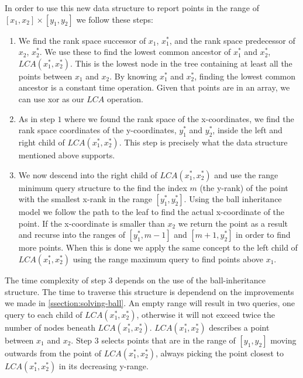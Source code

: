 In order to use this new data structure to report points in the range of $[x_1, x_2] \times [y_1, y_2]$ we follow these steps:
\begin{enumerate}
  \item We find the rank space successor of $x_1$, $x^*_1$, and the rank space predecessor of $x_2$, $x^*_2$. We use these to find the lowest common ancestor of $x^*_1$ and $x^*_2$, $LCA(x^*_1, x^*_2)$. This is the lowest node in the tree containing at least all the points between $x_1$ and $x_2$. By knowing $x^*_1$ and $x^*_2$, finding the lowest common ancestor is a constant time operation. Given that points are in an array, we can use xor as our $LCA$ operation. 
  \item As in step $1$ where we found the rank space of the x-coordinates, we find the rank space coordinates of the y-coordinates, $y^*_1$ and $y^*_2$, inside the left and right child of $LCA(x^*_1, x^*_2)$. This step is precisely what the data structure mentioned above supports.
  \item We now descend into the right child of $LCA(x^*_1, x^*_2)$ and use the range minimum query structure to the find the index $m$ (the y-rank) of the point with the smallest x-rank in the range $[y^*_1, y^*_2]$. Using the ball inheritance model we follow the path to the leaf to find the actual x-coordinate of the point. If the x-coordinate is smaller than $x_2$ we return the point as a result and recurse into the ranges of $[y^*_1, m-1]$ and $[m+1, y^*_2]$ in order to find more points. When this is done we apply the same concept to the left child of $LCA(x^*_1, x^*_2)$ using the range maximum query to find points above $x_1$.
\end{enumerate}


The time complexity of step $3$ depends on the use of the ball-inheritance structure. The time to traverse this structure is dependend on the improvements we made in \ref{ssection:solving-ball}. An empty range will result in two queries, one query to each child of $LCA(x^*_1, x^*_2)$, otherwise it will not exceed twice the number of nodes beneath $LCA(x^*_1, x^*_2)$.  $LCA(x^*_1, x^*_2)$ describes a point between $x_1$ and $x_2$. Step $3$ selects points that are in the range of $[y_1, y_2]$ moving outwards from the point of $LCA(x^*_1, x^*_2)$, always picking the point closest to $LCA(x^*_1, x^*_2)$ in its decreasing y-range. 

